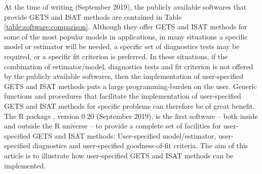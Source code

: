 At the time of writing (September 2019), the publicly available softwares that provide GETS and ISAT methods are contained in Table \ref{table:software:comparison}. Although they offer GETS and ISAT methods for some of the most popular models in applications, in many situations a specific model or estimator will be needed, a specific set of diagnostics tests may be required, or a specific fit criterion is preferred. In these situations, if the combination of estimator/model, diagnostics tests and fit criterion is not offered by the publicly available softwares, then the implementation of user-specified GETS and ISAT methods puts a large programming-burden on the user. Generic functions and procedures that facilitate the implementation of user-specified GETS and ISAT methods for specific problems can therefore be of great benefit. The R package , version 0.20 (September 2019), is the first software -- both inside and outside the R universe -- to provide a complete set of facilities for user-specified GETS and ISAT methods: User-specified model/estimator, user-specified diagnostics and user-specified goodness-of-fit criteria. The aim of this article is to illustrate how user-specified GETS and ISAT methods can be implemented.

